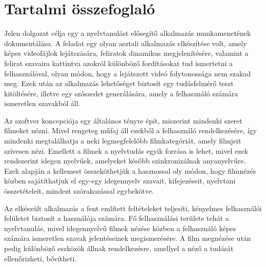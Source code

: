 \chapter*{Tartalmi összefoglaló}

Jelen dolgozat célja egy a nyelvtanulást elősegítő alkalmazás munkamenetének dokumentálása. A feladat egy olyan asztali alkalmazás elkészítése volt, amely képes videofájlok lejátszására, feliratok dinamikus megjelenítésére, valamint a felirat szavaira kattintva azokról különböző fordításokat tud ismertetni a felhasználóval, olyan módon, hogy a lejátszott videó folytonossága nem szakad meg. Ezek után az alkalmazás lehetőséget biztosít egy tudásfelmérő teszt kitöltésére, illetve egy szószedet generálására, amely a felhasználó számára ismeretlen szavakból áll. 

Az szoftver koncepciója egy általános tényre épít, miszerint mindenki szeret filmeket nézni. Mivel rengeteg műfaj áll ezekből a felhasználó rendelkezésére, így mindenki megtalálhatja a neki legmegfelelőbb filmkategóriát, amely filmjeit szívesen nézi. Emellett a filmek a nyelvtudás egyik forrása is lehet, mivel ezek rendszerint idegen nyelvűek, amelyeket később szinkronizálnak anyanyelvűre. Ezek alapján  a kellemest összeköthetjük a hasznossal oly módon, hogy filmnézés közben sajátíthatjuk el egy-egy idegennyelv szavait, kifejezéseit, nyelvtani összetételeit, mindezt szórakozással egybekötve.

Az elkészült alkalmazás a fent említett feltételeket teljesíti, kényelmes felhasználói felületet biztosít a használója számára. Fő felhasználási területe tehát a nyelvtanulás, mivel idegennyelvű filmek nézése közben a felhasználó képes számára ismeretlen szavak jelentéseinek megismerésére. A film megnézése után pedig különböző eszközök állnak rendelkezésre, amellyel a néző a tudását ellenőrizheti, bővítheti.